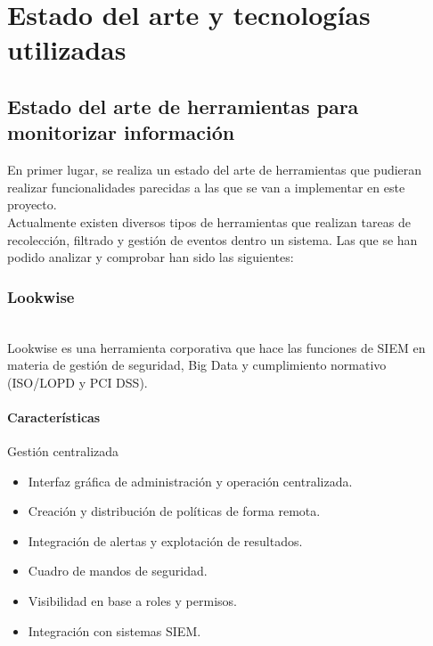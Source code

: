 \chapter[Arte]{Estado del arte y tecnologías utilizadas}
\label{chap:estado del arte}

\section[Estado del arte]{Estado del arte de herramientas para monitorizar información}

En primer lugar, se realiza un estado del arte de herramientas que pudieran realizar funcionalidades parecidas a las que se van a implementar en este proyecto.\\

Actualmente existen diversos tipos de herramientas que realizan tareas de recolección, filtrado y gestión de eventos dentro un sistema. Las que se han podido analizar y comprobar han sido las siguientes:

\subsection{Lookwise}
\\

Lookwise es una herramienta corporativa que hace las funciones de SIEM en materia de gestión de seguridad, Big Data y cumplimiento normativo (ISO/LOPD y PCI DSS).

\subsubsection{Características}

Gestión centralizada
\begin{itemize}
\item Interfaz gráfica de administración y operación centralizada.
\item Creación y distribución de políticas de forma remota.
\item Integración de alertas y explotación de resultados.
\item Cuadro de mandos de seguridad.
\item Visibilidad en base a roles y permisos.
\item Integración con sistemas SIEM.
\end{itemize}

